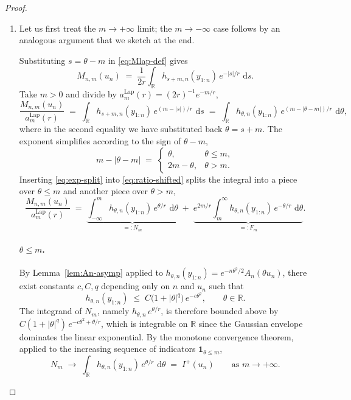 \documentclass[12pt, a4paper]{report}
\newcommand{\dd}{\,\mathrm{d}}
\newcommand{\Lap}{\mathrm{Lap}}
\newcommand{\1}{\mathbf{1}}
\begin{document}
\begin{proof}
\begin{enumerate}
    \item[(a)] Let us first treat the $m\to+\infty$ limit; the $m\to-\infty$ case follows by an
analogous argument that we sketch at the end.

Substituting $s = \theta - m$ in \eqref{eq:Mlap-def} gives
\begin{equation}\label{eq:Mlap-shifted}
  M_{n,m}(u_n)
  \;=\;\frac{1}{2r}\int_\mathbb{R} h_{s+m,n}(y_{1:n})\,e^{-|s|/r}\,\dd s.
\end{equation}
Take $m>0$ and divide by $a_m^{\Lap}(r) = (2r)^{-1}e^{-m/r}$,
\begin{equation}\label{eq:ratio-shifted}
  \frac{M_{n,m}(u_n)}{a_m^{\Lap}(r)}
  \;=\;\int_\mathbb{R} h_{s+m,n}(y_{1:n})\,e^{(m-|s|)/r}\,\dd s
  \;=\;\int_\mathbb{R} h_{\theta,n}(y_{1:n})\,e^{(m-|\theta-m|)/r}\,\dd\theta,
\end{equation}
where in the second equality we have substituted back $\theta = s+m$.
The exponent simplifies according to the sign of $\theta-m$,
\begin{equation}\label{eq:exp-split}
  m - |\theta-m|
  \;=\;
  \begin{cases}
    \theta, & \theta \leq m,\\[2pt]
    2m-\theta, & \theta > m.
  \end{cases}
\end{equation}
Inserting \eqref{eq:exp-split} into \eqref{eq:ratio-shifted} splits the
integral into a piece over $\theta\leq m$ and another piece over $\theta>m$,
\begin{equation}\label{eq:two-pieces}
  \frac{M_{n,m}(u_n)}{a_m^{\Lap}(r)}
  \;=\;\underbrace{\int_{-\infty}^m h_{\theta,n}(y_{1:n})\,e^{\theta/r}\,\dd\theta}_{=:N_m}
  \;+\;\underbrace{e^{2m/r}\int_m^\infty h_{\theta,n}(y_{1:n})\,e^{-\theta/r}\,\dd\theta}_{=:F_m}.
\end{equation}

\paragraph{$\theta \leq m$.} \quad
By Lemma~\ref{lem:An-asymp} applied to $h_{\theta,n}(y_{1:n})
= e^{-n\theta^2/2}A_n(\theta u_n)$, there exist constants
$c, C, q$ depending only on $n$ and $u_n$ such that
\begin{equation}\label{eq:h-env}
  h_{\theta,n}(y_{1:n})
  \;\leq\; C\bigl(1+|\theta|^q\bigr)\,e^{-c\theta^2},
  \qquad \theta\in\mathbb{R}.
\end{equation}
The integrand of $N_m$, namely $h_{\theta,n}\,e^{\theta/r}$, is
therefore bounded above by $C(1+|\theta|^q)\,e^{-c\theta^2+\theta/r}$,
which is integrable on $\mathbb{R}$ since the Gaussian envelope dominates the linear exponential. By the monotone convergence theorem, applied to
the increasing sequence of indicators $\1_{\theta\leq m}$,
\begin{equation}\label{eq:near-limit}
  N_m \;\longrightarrow\;\int_\mathbb{R} h_{\theta,n}(y_{1:n})\,e^{\theta/r}\,\dd\theta
  \;=\;I^+(u_n)
  \qquad\text{as }m\to+\infty.
\end{equation}


\end{enumerate}
\end{proof}
\end{document}
